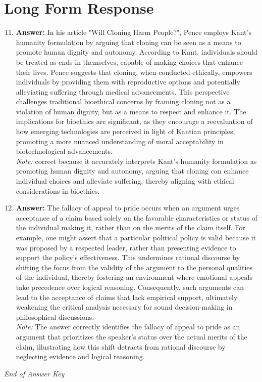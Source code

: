 \documentclass[12pt]{article}
\begin{document}
\section*{Long Form Response}
\begin{enumerate}[label=\arabic*.]
\setcounter{enumi}{10}
\item \textbf{Answer:} In his article "Will Cloning Harm People?", Pence employs Kant's humanity formulation by arguing that cloning can be seen as a means to promote human dignity and autonomy. According to Kant, individuals should be treated as ends in themselves, capable of making choices that enhance their lives. Pence suggests that cloning, when conducted ethically, empowers individuals by providing them with reproductive options and potentially alleviating suffering through medical advancements. This perspective challenges traditional bioethical concerns by framing cloning not as a violation of human dignity, but as a means to respect and enhance it. The implications for bioethics are significant, as they encourage a reevaluation of how emerging technologies are perceived in light of Kantian principles, promoting a more nuanced understanding of moral acceptability in biotechnological advancements.
\\ \textit{Note:} correct because it accurately interprets Kant's humanity formulation as promoting human dignity and autonomy, arguing that cloning can enhance individual choices and alleviate suffering, thereby aligning with ethical considerations in bioethics.
\item \textbf{Answer:} The fallacy of appeal to pride occurs when an argument urges acceptance of a claim based solely on the favorable characteristics or status of the individual making it, rather than on the merits of the claim itself. For example, one might assert that a particular political policy is valid because it was proposed by a respected leader, rather than presenting evidence to support the policy's effectiveness. This undermines rational discourse by shifting the focus from the validity of the argument to the personal qualities of the individual, thereby fostering an environment where emotional appeals take precedence over logical reasoning. Consequently, such arguments can lead to the acceptance of claims that lack empirical support, ultimately weakening the critical analysis necessary for sound decision-making in philosophical discussions.
\\ \textit{Note:} The answer correctly identifies the fallacy of appeal to pride as an argument that prioritizes the speaker's status over the actual merits of the claim, illustrating how this shift detracts from rational discourse by neglecting evidence and logical reasoning.
\end{enumerate}

\vfill
\noindent\textit{End of Answer Key}
\end{document}
